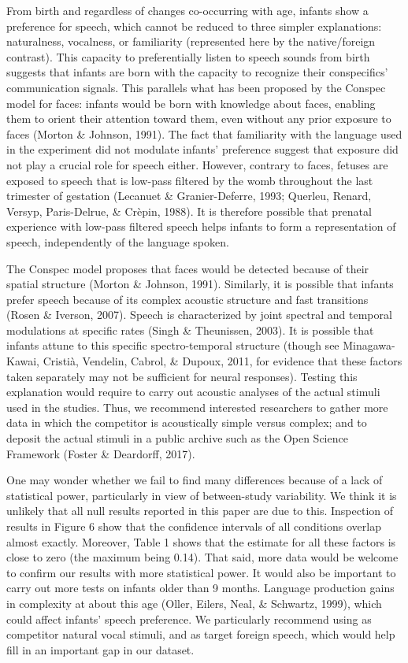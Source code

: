 \documentclass[man,floatsintext]{apa6}
\begin{document}
From birth and regardless of changes co-occurring with age, infants show
a preference for speech, which cannot be reduced to three simpler
explanations: naturalness, vocalness, or familiarity (represented here
by the native/foreign contrast). This capacity to preferentially listen
to speech sounds from birth suggests that infants are born with the
capacity to recognize their conspecifics' communication signals. This
parallels what has been proposed by the Conspec model for faces: infants
would be born with knowledge about faces, enabling them to orient their
attention toward them, even without any prior exposure to faces (Morton
\& Johnson, 1991). The fact that familiarity with the language used in
the experiment did not modulate infants' preference suggest that
exposure did not play a crucial role for speech either. However,
contrary to faces, fetuses are exposed to speech that is low-pass
filtered by the womb throughout the last trimester of gestation
(Lecanuet \& Granier-Deferre, 1993; Querleu, Renard, Versyp,
Paris-Delrue, \& Crèpin, 1988). It is therefore possible that prenatal
experience with low-pass filtered speech helps infants to form a
representation of speech, independently of the language spoken.

The Conspec model proposes that faces would be detected because of their
spatial structure (Morton \& Johnson, 1991). Similarly, it is possible
that infants prefer speech because of its complex acoustic structure and
fast transitions (Rosen \& Iverson, 2007). Speech is characterized by
joint spectral and temporal modulations at specific rates (Singh \&
Theunissen, 2003). It is possible that infants attune to this specific
spectro-temporal structure (though see Minagawa-Kawai, Cristià,
Vendelin, Cabrol, \& Dupoux, 2011, for evidence that these factors taken
separately may not be sufficient for neural responses). Testing this
explanation would require to carry out acoustic analyses of the actual
stimuli used in the studies. Thus, we recommend interested researchers
to gather more data in which the competitor is acoustically simple
versus complex; and to deposit the actual stimuli in a public archive
such as the Open Science Framework (Foster \& Deardorff, 2017).

One may wonder whether we fail to find many differences because of a
lack of statistical power, particularly in view of between-study
variability. We think it is unlikely that all null results reported in
this paper are due to this. Inspection of results in Figure 6 show that
the confidence intervals of all conditions overlap almost exactly.
Moreover, Table 1 shows that the estimate for all these factors is close
to zero (the maximum being 0.14). That said, more data would be welcome
to confirm our results with more statistical power. It would also be
important to carry out more tests on infants older than 9 months.
Language production gains in complexity at about this age (Oller,
Eilers, Neal, \& Schwartz, 1999), which could affect infants' speech
preference. We particularly recommend using as competitor natural vocal
stimuli, and as target foreign speech, which would help fill in an
important gap in our dataset.
\end{document}
